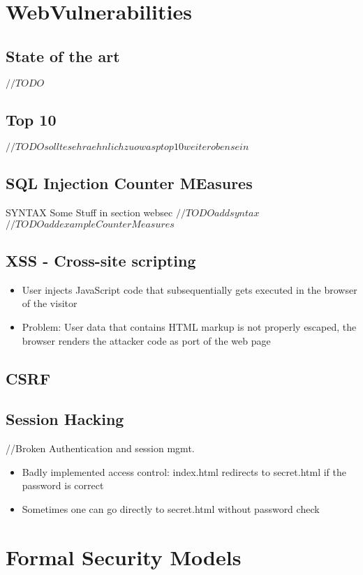 \documentclass[a4paper, 12pt]{article}
\begin{document}
\section{WebVulnerabilities}
\subsection{State of the art}
$ //TODO $
\subsection{Top 10}
$ //TODO sollte sehr aehnlich zu owasp top 10 weiter oben sein$
\subsection{SQL Injection Counter MEasures}
SYNTAX
Some Stuff in section websec 
$ //TODO add syntax $
$ //TODO add example Counter Measures $
\subsection{XSS - Cross-site scripting}
\begin{itemize}
\item User injects JavaScript code that subsequentially gets executed in the browser of the visitor
\item Problem: User data that contains HTML markup is not properly escaped, the browser renders the attacker code as port of the web page
\end{itemize}

\subsection{CSRF}
\subsection{Session Hacking}
//Broken Authentication and session mgmt.
\begin{itemize}
\item Badly implemented access control: index.html redirects to secret.html if the password is correct
\item Sometimes one can go directly to secret.html without password check
\end{itemize}

\section{Formal Security Models}
\end{document}
